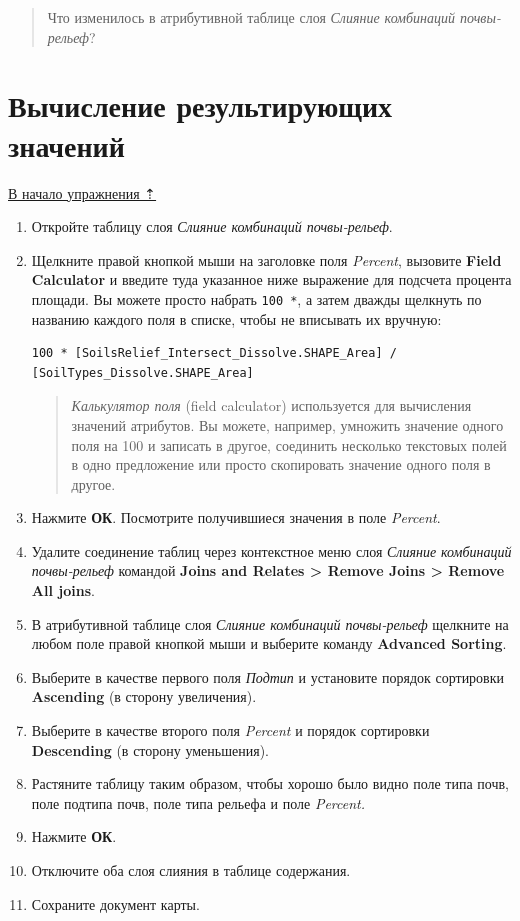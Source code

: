 \documentclass[]{book}
\theoremstyle{definition}
\theoremstyle{definition}
\theoremstyle{definition}
\theoremstyle{remark}
\begin{document}
\begin{quote}
Что изменилось в атрибутивной таблице слоя \emph{Слияние комбинаций
почвы-рельеф}?
\end{quote}

\hypertarget{overlay-resulting}{%
\section{Вычисление результирующих значений}\label{overlay-resulting}}

\protect\hyperlink{overlay}{В начало упражнения ⇡}

\begin{enumerate}
\def\labelenumi{\arabic{enumi}.}
\item
  Откройте таблицу слоя \emph{Слияние комбинаций почвы-рельеф}.
\item
  Щелкните правой кнопкой мыши на заголовке поля \emph{Percent},
  вызовите \textbf{Field Calculator} и введите туда указанное ниже
  выражение для подсчета процента площади. Вы можете просто набрать
  \texttt{100\ *}, а затем дважды щелкнуть по названию каждого поля в
  списке, чтобы не вписывать их вручную:

\begin{verbatim}
100 * [SoilsRelief_Intersect_Dissolve.SHAPE_Area] /
[SoilTypes_Dissolve.SHAPE_Area]
\end{verbatim}

  \begin{quote}
  \emph{Калькулятор поля} (field calculator) используется для вычисления
  значений атрибутов. Вы можете, например, умножить значение одного поля
  на 100 и записать в другое, соединить несколько текстовых полей в одно
  предложение или просто скопировать значение одного поля в другое.
  \end{quote}
\item
  Нажмите \textbf{ОК}. Посмотрите получившиеся значения в поле
  \emph{Percent}.
\item
  Удалите соединение таблиц через контекстное меню слоя \emph{Слияние
  комбинаций почвы-рельеф} командой \textbf{Joins and Relates
  \textgreater{} Remove Joins \textgreater{} Remove All joins}.
\item
  В атрибутивной таблице слоя \emph{Слияние комбинаций почвы-рельеф}
  щелкните на любом поле правой кнопкой мыши и выберите команду
  \textbf{Advanced Sorting}.
\item
  Выберите в качестве первого поля \emph{Подтип} и установите порядок
  сортировки \textbf{Ascending} (в сторону увеличения).
\item
  Выберите в качестве второго поля \emph{Percent} и порядок сортировки
  \textbf{Descending} (в сторону уменьшения).
\item
  Растяните таблицу таким образом, чтобы хорошо было видно поле типа
  почв, поле подтипа почв, поле типа рельефа и поле \emph{Percent.}
\item
  Нажмите \textbf{ОК}.
\item
  Отключите оба слоя слияния в таблице содержания.
\item
  Сохраните документ карты.


\end{enumerate}
\end{document}

